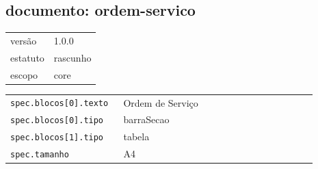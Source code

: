 \subsection*{documento: ordem-servico}
\begin{tabular}{@{}ll@{}}
versão & 1.0.0 \\
estatuto & rascunho \\
escopo & core \\
\end{tabular}

\begin{tabular}{@{}p{0.35\linewidth}p{0.6\linewidth}@{}}
\texttt{spec.blocos[0].texto} & Ordem de Serviço \\
\texttt{spec.blocos[0].tipo} & barraSecao \\
\texttt{spec.blocos[1].tipo} & tabela \\
\texttt{spec.tamanho} & A4 \\
\end{tabular}
